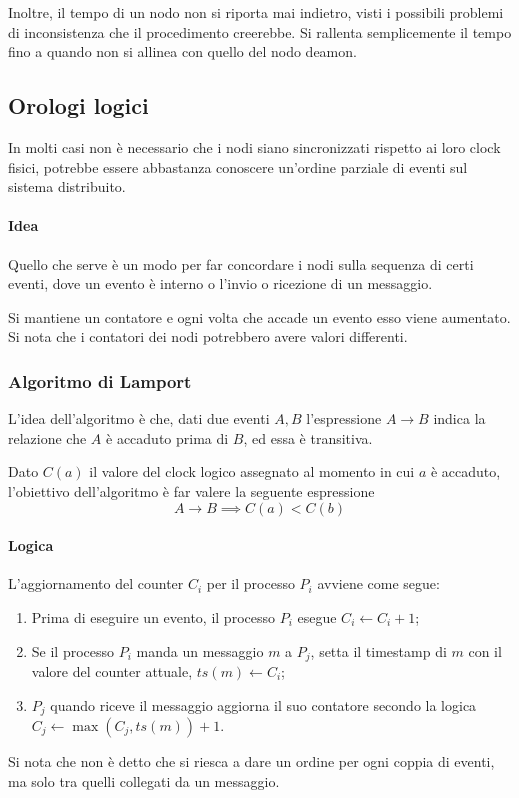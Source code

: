 Inoltre, il tempo di un nodo non si riporta mai indietro, 
visti i possibili problemi di inconsistenza che il procedimento 
creerebbe. Si rallenta semplicemente il tempo fino a quando 
non si allinea con quello del nodo deamon.

\subsection{Orologi logici}

In molti casi non è necessario che i nodi siano sincronizzati 
rispetto ai loro clock fisici, potrebbe essere abbastanza 
conoscere un'ordine parziale di eventi sul sistema distribuito.

\paragraph{Idea}
Quello che serve è un modo per far concordare i nodi sulla
sequenza di certi eventi, dove un evento 
è interno o l'invio o ricezione di un messaggio. 

Si mantiene un contatore e ogni volta che accade un evento 
esso viene aumentato. Si nota che i contatori 
dei nodi potrebbero avere valori differenti.

\subsubsection{Algoritmo di Lamport}

L'idea dell'algoritmo è che, dati due eventi 
$A, B$ l'espressione $A \rightarrow B$ indica la relazione 
che $A$ è accaduto prima di $B$, ed essa è transitiva.

Dato $C(a)$ il valore del clock logico assegnato 
al momento in cui $a$ è accaduto, l'obiettivo dell'algoritmo 
è far valere la seguente espressione
$$A \rightarrow B \implies C(a) < C(b)$$

\paragraph{Logica}
L'aggiornamento del counter $C_i$ per il 
processo $P_i$ avviene come segue: 
\begin{enumerate}
    \item Prima di eseguire un evento, il processo $P_i$ 
    esegue $C_i \gets C_i + 1$;
    \item Se il processo $P_i$ manda un messaggio $m$ a $P_j$, 
    setta il timestamp di $m$ con il valore del counter attuale, 
    $ts(m) \gets C_i$;
    \item $P_j$ quando riceve il messaggio aggiorna il suo 
    contatore secondo la logica $C_j \gets \max(C_j, ts(m)) + 1$.
\end{enumerate}
Si nota che non è detto che si riesca a dare un ordine per ogni 
coppia di eventi, ma solo tra quelli collegati da un messaggio.

